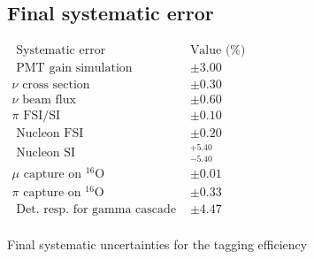\newpage


\subsection{Final systematic error}

\begin{table}[htb!]
\centering
    $\begin{array}{lll}
    \hline \text { Systematic error} & \text{Value (\%)} \\
    \hline 
    \text { PMT gain simulation } & \pm 3.00 \\ 
    \nu \text { cross section } & \pm 0.30 \\ 
    \nu \text { beam flux } & \pm 0.60 \\ 
    \pi \text { FSI/SI } & \pm 0.10  \\ 
    \text { Nucleon FSI } & \pm 0.20  \\ 
    \text { Nucleon SI } & { }_{-5.40}^{+5.40} \\ 
    \mu \text { capture on }{ }^{16} \mathrm{O} & \pm 0.01\\ 
    \pi \text { capture on }{ }^{16} \mathrm{O} & \pm 0.33\\  
    \text { Det. resp. for gamma cascade }& \pm 4.47 \\ 
    \end{array}$
\caption{Final systematic uncertainties for the tagging efficiency} 
\label{table:systuncertaintytable}
\end{table}